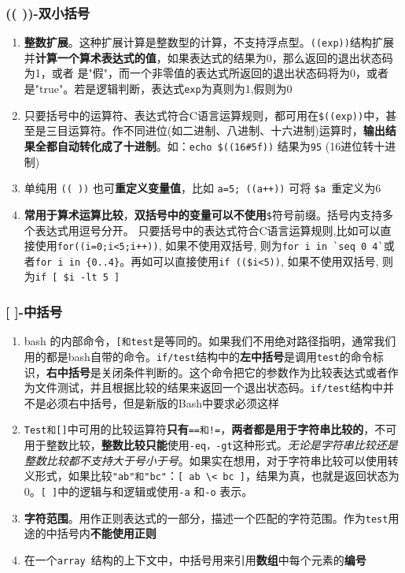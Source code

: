 \documentclass[UTF8,a4paper,12pt]{ctexbook}
\begin{document}
			\subsubsection{(( ))-双小括号}
				\begin{enumerate}
					\item \textbf{整数扩展}。这种扩展计算是整数型的计算，不支持浮点型。\verb|((exp))|结构扩展并\textbf{计算一个算术表达式的值}，如果表达式的结果为0，那么返回的退出状态码为1，或者 是"假"，而一个非零值的表达式所返回的退出状态码将为0，或者是"true"。若是逻辑判断，表达式\verb|exp|为真则为1,假则为0
					
					\item 只要括号中的运算符、表达式符合C语言运算规则，都可用在\verb|$((exp))|中，甚至是三目运算符。作不同进位(如二进制、八进制、十六进制)运算时，\textbf{输出结果全都自动转化成了十进制}。如：\verb|echo $((16#5f))| 结果为\verb|95| (16进位转十进制)
					
					\item 单纯用 \verb|(( ))| 也可\textbf{重定义变量值}，比如 \verb|a=5; ((a++))| 可将 \verb|$a |重定义为6
					
					\item \textbf{常用于算术运算比较}，\textbf{双括号中的变量可以不使用}\verb|$|符号前缀。括号内支持多个表达式用逗号分开。 只要括号中的表达式符合C语言运算规则,比如可以直接使用\verb|for((i=0;i<5;i++))|, 如果不使用双括号, 则为\verb|for i in `seq 0 4`|或者\verb|for i in {0..4}|。再如可以直接使用\verb|if (($i<5))|, 如果不使用双括号, 则为\verb|if [ $i -lt 5 ]|
				\end{enumerate}
				
			\subsubsection{[ ]-中括号}
				\begin{enumerate}
					\item bash 的内部命令，\verb|[和test|是等同的。如果我们不用绝对路径指明，通常我们用的都是bash自带的命令。\verb|if/test|结构中的\textbf{左中括号}是调用\verb|test|的命令标识，\textbf{右中括号}是关闭条件判断的。这个命令把它的参数作为比较表达式或者作为文件测试，并且根据比较的结果来返回一个退出状态码。\verb|if/test|结构中并不是必须右中括号，但是新版的Bash中要求必须这样
					
					\item \verb|Test和[]|中可用的比较运算符\textbf{只有}\verb|==和!=|，\textbf{两者都是用于字符串比较的}，不可用于整数比较，\textbf{整数比较只能}使用\verb|-eq，-gt|这种形式。\textit{无论是字符串比较还是整数比较都不支持大于号小于号}。如果实在想用，对于字符串比较可以使用转义形式，如果比较\verb|"ab"和"bc"|：\verb|[ ab \< bc ]|，结果为真，也就是返回状态为0。\verb|[ ]|中的逻辑与和逻辑或使用\verb|-a| 和\verb|-o| 表示。
					
					\item \textbf{字符范围}。用作正则表达式的一部分，描述一个匹配的字符范围。作为\verb|test|用途的中括号内\textbf{不能使用正则}
					
					\item 在一个\verb|array |结构的上下文中，中括号用来引用\textbf{数组}中每个元素的\textbf{编号}
				\end{enumerate}
				
\end{document}

